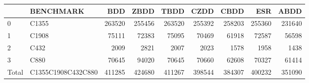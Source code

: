 \begin{tabular}{llrrrrrrr}
\toprule
 & BENCHMARK & BDD & ZBDD & TBDD & CZDD & CBDD & ESR & ABDD \\
\midrule
0 & C1355 & 263520 & 255456 & 263520 & 255392 & 258203 & 255360 & 231640 \\
1 & C1908 & 75111 & 72383 & 75095 & 70469 & 61918 & 72587 & 56598 \\
2 & C432 & 2009 & 2821 & 2007 & 2023 & 1578 & 1958 & 1438 \\
3 & C880 & 70645 & 94020 & 70645 & 70660 & 62608 & 70327 & 61414 \\
Total & C1355C1908C432C880 & 411285 & 424680 & 411267 & 398544 & 384307 & 400232 & 351090 \\
\bottomrule
\end{tabular}
